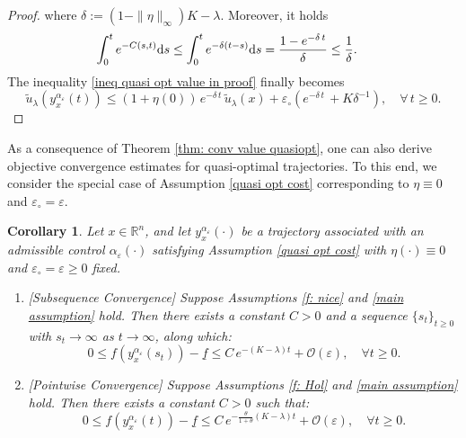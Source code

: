 \documentclass[12pt]{amsart}
\newcommand{\D}[1]{\mbox{\rm #1}}
\newcommand{\dd}{\D{d}}
\numberwithin{equation}{section}
\theoremstyle{plain}
\newtheorem{corollary}[theorem]{Corollary}
\begin{document}
\begin{proof}
where $\delta := (1-\|\eta\|_{\infty})K - \lambda$. \;  
Moreover, it holds
\begin{equation*}
\begin{aligned}
    \int_{0}^{t}e^{-C(s,t)}\dd s
    & \leq \int_{0}^{t}e^{-\delta(t-s)} \dd s = \frac{1 - e^{-\delta \,t}}{\delta} \leq \frac{1}{\delta}.
\end{aligned}
\end{equation*}
The inequality \eqref{ineq quasi opt value in proof} finally becomes
\begin{equation*}
    \tilde{u}_{\lambda}(y_{x}^{\alpha_{\varepsilon}}(t)) \leq (1+\eta(0))\, e^{-\delta\, t}\,\tilde{u}_{\lambda}(x) + \varepsilon_{\circ} \left(e^{-\delta\,t}\,+K\delta^{-1}\right), \quad \forall\,t\geq0.
\end{equation*}
\end{proof}


As a consequence of Theorem \ref{thm: conv value quasiopt}, one can also derive objective convergence estimates for quasi-optimal trajectories. To this end, we consider the special case of Assumption \ref{quasi opt cost} corresponding to $\eta\equiv0$ and $\varepsilon_\circ=\varepsilon$.

\begin{corollary}
Let $x\in\mathbb R^n$, and let $y_x^{\alpha_\varepsilon}(\cdot)$ be a trajectory associated with an admissible control $\alpha_\varepsilon(\cdot)$ satisfying Assumption \ref{quasi opt cost} with $\eta(\cdot)\equiv0$ and $\varepsilon_\circ=\varepsilon\geq 0$ fixed. 

\begin{enumerate}[label=(\roman*)]
    \item\label{subseq conv eps} \textit{[Subsequence Convergence]} Suppose Assumptions \ref{f: nice} and \ref{main assumption} hold. Then there exists a constant $C > 0$ and a sequence $\{s_t\}_{t \ge 0}$ with $s_t \to \infty$ as $t \to \infty$, along which:
    \begin{equation*}
    0 \le f(y_x^{\alpha_{\varepsilon}}(s_t)) - \underline{f} \le C\, e^{-(K-\lambda)t} + \mathcal{O}(\varepsilon), 
    \quad \forall t \ge 0.
    \end{equation*}

    \item\label{pt conv eps} \textit{[Pointwise Convergence]} Suppose Assumptions \ref{f: Hol} and \ref{main assumption} hold. Then there exists a constant $C > 0$ such that:
    \begin{equation*}
    0 \le f(y_x^{\alpha_{\varepsilon}}(t)) - \underline{f} \le C\, e^{-\frac{\theta}{1+\theta}(K-\lambda)t} + \mathcal{O}(\varepsilon),  
    \quad \forall t \ge 0.
    \end{equation*}
\end{enumerate}
\end{corollary}
\end{document}
